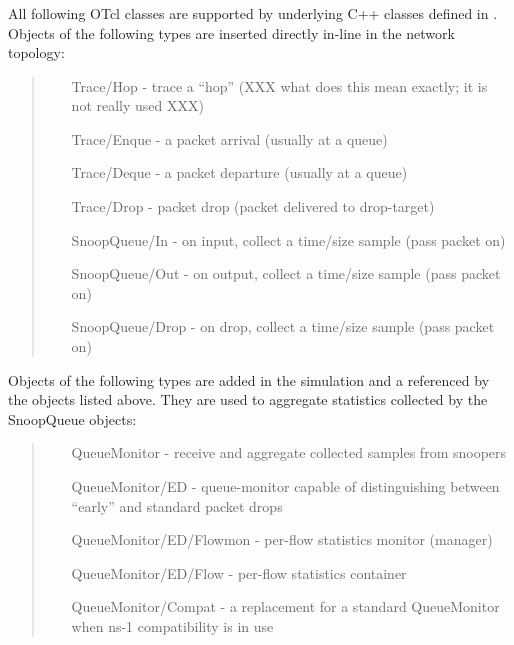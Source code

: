 \subsubsection{}
All following OTcl classes are supported by underlying C++
classes defined in .
Objects of the following types are inserted directly in-line in the
network topology:
\begin{quote}
\begin{itemize}
	\item [Trace/Hop] - trace a ``hop'' (XXX what does this mean exactly; it is not really used XXX)
	\item [Trace/Enque] - a packet arrival (usually at a queue)
	\item [Trace/Deque] - a packet departure (usually at a queue)
	\item [Trace/Drop] - packet drop (packet delivered to drop-target)
	\item [SnoopQueue/In] - on input, collect a time/size sample (pass packet on)
	\item [SnoopQueue/Out] - on output, collect a time/size sample (pass packet on)
	\item [SnoopQueue/Drop] - on drop, collect a time/size sample (pass packet on)
\end{itemize}
\end{quote}
Objects of the following types are added in the simulation and a referenced
by the objects listed above.  They are used to aggregate statistics collected
by the SnoopQueue objects:
\begin{quote}
\begin{itemize}
	\item [QueueMonitor] - receive and aggregate collected samples from snoopers
	\item [QueueMonitor/ED] - queue-monitor capable of distinguishing between ``early'' and standard packet drops
	\item [QueueMonitor/ED/Flowmon] - per-flow statistics monitor (manager)
	\item [QueueMonitor/ED/Flow] - per-flow statistics container
	\item [QueueMonitor/Compat] - a replacement for a standard QueueMonitor when ns-1 compatibility is in use
\end{itemize}
\end{quote}

